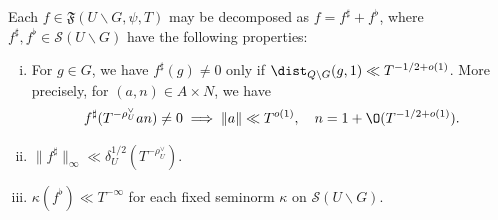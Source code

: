 \begin{proposition}\label{prop:standard:each-f-in}
  Each $f \in \mathfrak{F}(U \backslash G, \psi, T)$ may be decomposed as $f = f^\sharp + f^\flat$, where $f^\sharp, f^{\flat} \in \mathcal{S}(U \backslash G)$ have the following properties:
  \begin{enumerate}[(i)]
  \item \label{itm:standard:prop-decompose-frakF-4} For $g \in G$, we have $f^\sharp (g) \neq 0$ only if $\dist_{Q \backslash G}(g,1) \ll T^{-1/2 + o(1)}$.  More precisely, for $(a,n) \in A \times N$, we have
    \begin{equation*}
      f^\sharp (T^{-\rho_U^\vee} a n) \neq 0 \implies \|a\| \ll T^{o(1)}, \quad n = 1 + \O(T^{-1/2+o(1)}).
    \end{equation*}
  \item $\|f^\sharp \|_{\infty} \ll \delta_U^{1/2}(T^{-\rho_U^\vee})$.
  \item $\kappa(f^{\flat}) \ll T^{-\infty}$ for each fixed seminorm $\kappa$ on $\mathcal{S}(U \backslash G)$.
  \end{enumerate}
\end{proposition}
